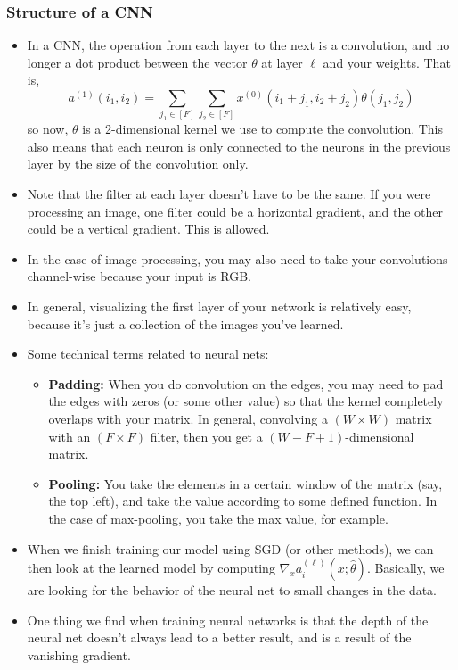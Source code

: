 \subsubsection{Structure of a CNN}
\begin{itemize}
	\item In a CNN, the operation from each layer to the next is a convolution, and
		no longer a dot product between the vector \( \theta \) at layer \( \ell \)
		and your weights. That is, 
		\[
			a^{(1)}(i_1, i_2) = \sum_{j_1 \in [F]} \sum_{j_2 \in [F]} x^{(0)}(i_1 +
			j_1, i_2 + j_2) \theta(j_1, j_2)
		\]
		so now, \( \theta \) is a 2-dimensional kernel we use to compute the
		convolution. This also means that each neuron is only connected to the
		neurons in the previous layer by the size of the convolution only.    


	\item Note that the filter at each layer doesn't have to be the same. If you were
		processing an image, one filter could be a horizontal gradient, and the other
		could be a vertical gradient. This is allowed.  
	\item In the case of image processing, you may also need to take your
		convolutions channel-wise because your input is RGB.  
	\item In general, visualizing the first layer of your network is relatively easy,
		because it's just a collection of the images you've learned.

	\item Some technical terms related to neural nets: 
	\begin{itemize}
		\item \textbf{Padding:} When you do convolution on the edges, you may need to pad
			the edges with zeros (or some other value) so that the kernel completely
			overlaps with your matrix. In general, convolving a \( (W \times W) \) matrix
			with an \( (F \times F) \) filter, then you get a \( (W - F + 1)
			\)-dimensional matrix. 
		\item \textbf{Pooling:} You take the elements in a certain window of the matrix
			(say, the top left), and take the value according to some defined function.
			In the case of max-pooling, you take the max value, for example. 
	\end{itemize}
	\item When we finish training our model using SGD (or other methods), we can then
		look at the learned model by computing \( \nabla_x a_i^{(\ell)}(x;
		\hat{\theta}) \). Basically, we are looking for the behavior of the neural
		net to small changes in the data. 
	\item One thing we find when training neural networks is that the depth of the
		neural net doesn't always lead to a better result, and is a result of the
		vanishing gradient. 


\end{itemize}
